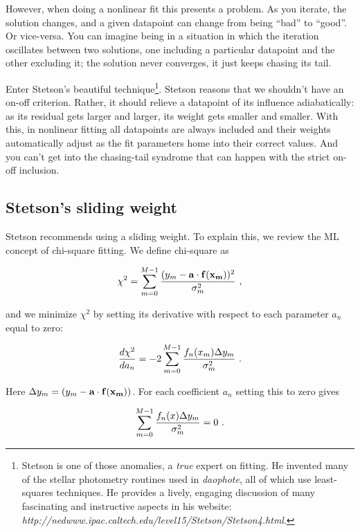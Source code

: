 \documentclass[psfig,preprint]{aastex}
\begin{document}
	However, when doing a nonlinear fit this presents a problem. As
you iterate, the solution changes, and a given datapoint can change from
being ``bad'' to ``good''. Or vice-versa. You can imagine being in a
situation in which the iteration oscillates between two solutions, one
including a particular datapoint and the other excluding it; the solution
never converges, it just keeps chasing its tail.

	Enter Stetson's beautiful technique\footnote{Stetson is one of
those anomalies, a {\it true} expert on fitting. He invented many of the
stellar photometry routines used in {\it daophote}, all of which use
least-squares techniques. He provides a lively, engaging discussion of
many fascinating and instructive aspects in his website: {\it
http://nedwww.ipac.caltech.edu/level15/Stetson/Stetson4.html}.}. Stetson
reasons that we shouldn't have an on-off criterion. Rather, it should
relieve a datapoint of its influence adiabatically: as its residual gets
larger and larger, its weight gets smaller and smaller. With this, in
nonlinear fitting all datapoints are always included and their weights
automatically adjust as the fit parameters home into their correct
values. And you can't get into the chasing-tail syndrome that can happen
with the strict on-off inclusion.

\subsection{Stetson's sliding weight} \label{sliding}

	Stetson recommends using a sliding weight. To explain this, we
review the ML concept of chi-square fitting. We define chi-square as


\begin{mathletters} \label{stetsonchisq1}

\begin{equation} \chi^2 = \sum_{m=0}^{M-1} { (y_m -
{\bf a \cdot f(x_m)})^2 \over \sigma_m^2} \ , 
\end{equation}

\noindent and we minimize $\chi^2$ by setting its derivative with
respect to each parameter $a_n$ equal to zero:

\begin{equation}
{d \chi^2 \over da_n} = -2 \sum_{m=0}^{M-1} { f_n(x_m) \Delta y_m \over
\sigma_m^2} \ .
\end{equation}

\noindent Here $\Delta y_m = (y_m - {\bf a \cdot f(x_m)})$. For each
coefficient $a_n$ setting this to zero gives

\begin{equation} \label{sevenonec}
\sum_{m=0}^{M-1} { f_n(x) \Delta y_m \over \sigma_m^2} = 0 \ .
\end{equation}
\end{mathletters}
\end{document}
